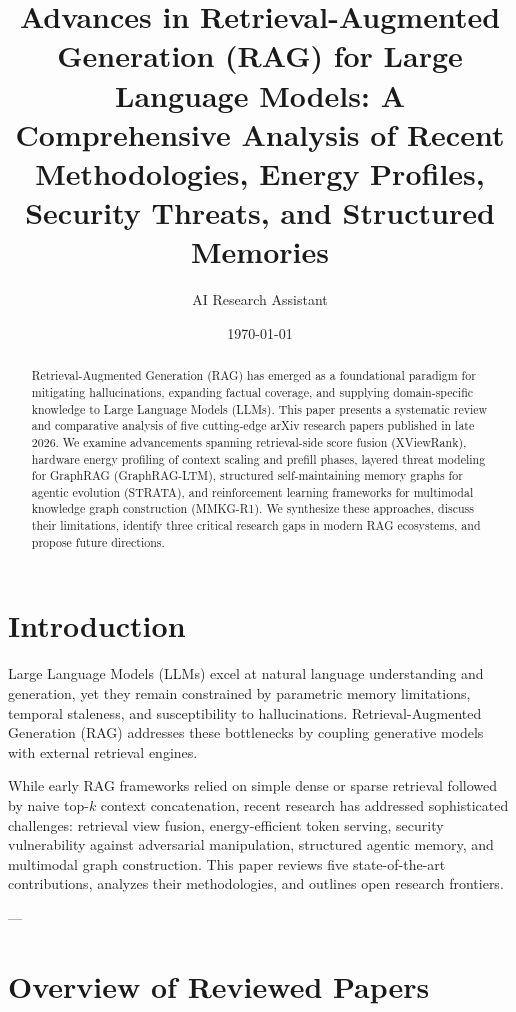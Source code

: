 \documentclass[11pt,a4paper]{article}
\title{\textbf{Advances in Retrieval-Augmented Generation (RAG) for Large Language Models: A Comprehensive Analysis of Recent Methodologies, Energy Profiles, Security Threats, and Structured Memories}}
\author{AI Research Assistant}
\date{\today}
\begin{document}
\maketitle

\begin{abstract}
Retrieval-Augmented Generation (RAG) has emerged as a foundational paradigm for mitigating hallucinations, expanding factual coverage, and supplying domain-specific knowledge to Large Language Models (LLMs). This paper presents a systematic review and comparative analysis of five cutting-edge arXiv research papers published in late 2026. We examine advancements spanning retrieval-side score fusion (XViewRank), hardware energy profiling of context scaling and prefill phases, layered threat modeling for GraphRAG (GraphRAG-LTM), structured self-maintaining memory graphs for agentic evolution (STRATA), and reinforcement learning frameworks for multimodal knowledge graph construction (MMKG-R1). We synthesize these approaches, discuss their limitations, identify three critical research gaps in modern RAG ecosystems, and propose future directions.
\end{abstract}

\section{Introduction}
Large Language Models (LLMs) excel at natural language understanding and generation, yet they remain constrained by parametric memory limitations, temporal staleness, and susceptibility to hallucinations. Retrieval-Augmented Generation (RAG) addresses these bottlenecks by coupling generative models with external retrieval engines. 

While early RAG frameworks relied on simple dense or sparse retrieval followed by naive top-$k$ context concatenation, recent research has addressed sophisticated challenges: retrieval view fusion, energy-efficient token serving, security vulnerability against adversarial manipulation, structured agentic memory, and multimodal graph construction. This paper reviews five state-of-the-art contributions, analyzes their methodologies, and outlines open research frontiers.

---

\section{Overview of Reviewed Papers}
\end{document}
